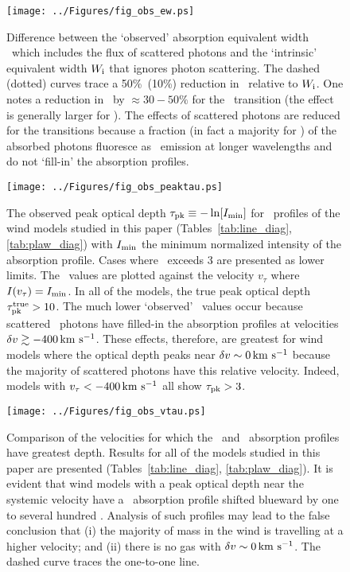 \documentclass[12pt,preprint]{aastex}
\begin{document}
\begin{figure}
\texttt{[image: ../Figures/fig\_obs\_ew.ps]}
\caption{
Difference between the `observed' absorption equivalent width \ewabs\
which includes the flux of scattered photons and the `intrinsic'
equivalent width $W_{\rm i}$ that ignores photon scattering.  The
dashed (dotted) curves trace a 50\%\ (10\%) reduction in \ewabs\
relative to $W_{\rm i}$.  One notes a reduction in \ewabs\ by $\approx
30-50\%$ for the \mgiia\ transition (the effect is generally larger
for \mgiib).  The effects of scattered photons are reduced for the
\ion{Fe}{2} transitions because a fraction (in fact a majority for
\feiia) of the absorbed photons fluoresce as \feiis\ emission at
longer wavelengths and do not `fill-in' the absorption profiles.
}
\label{fig:obs_ew}
\end{figure}

\begin{figure}
\texttt{[image: ../Figures/fig\_obs\_peaktau.ps]}
\caption{
The observed peak optical depth $\tau_{\rm pk} \equiv -\ln [I_{\rm
  min}]$ for \mgiia\ profiles of the wind models studied in this paper
(Tables~\ref{tab:line_diag}, \ref{tab:plaw_diag}) with $I_{\rm min}$
the minimum normalized intensity of the absorption profile.  Cases
where \tpk\ exceeds 3 are presented as lower limits.  The \tpk\ values
are plotted against the velocity $v_\tau$ where $I(v_\tau) = I_{\rm min}$.  In all
of the models, the true peak optical depth $\tau_{\rm pk}^{\rm true} > 10$.
The much lower `observed' \tpk\ values occur because scattered \mgiia\
photons have filled-in the absorption profiles at velocities $\delta v
\gtrsim -400 \, {\rm km~s^{-1}}$. These effects, therefore, are greatest for wind
models where the optical depth peaks near $\delta v \sim 0 \, {\rm km~s^{-1}}$ because
the majority of scattered photons have this relative velocity.
Indeed, models with $v_\tau < -400 \, {\rm km~s^{-1}}$ all show $\tau_{\rm pk} > 3$.
}
\label{fig:obs_peaktau}
\end{figure}

\begin{figure}
\texttt{[image: ../Figures/fig\_obs\_vtau.ps]}
\caption{
Comparison of the velocities for which the \feiia\ and \mgiia\ absorption
profiles have greatest depth.  Results for all of the models
studied in this paper are presented (Tables~\ref{tab:line_diag},
\ref{tab:plaw_diag}).  
It is evident that wind models with a peak optical depth near the
systemic velocity have a \mgiia\ absorption profile shifted blueward
by one to several hundred \kms.  Analysis of such profiles may lead to
the false conclusion 
that (i) the majority of mass in the wind is travelling at a higher
velocity; and (ii) there is no gas with $\delta v \sim 0 \, {\rm km~s^{-1}}$.
The dashed curve traces the one-to-one line.
}
\label{fig:obs_vtau}
\end{figure}
\end{document}
